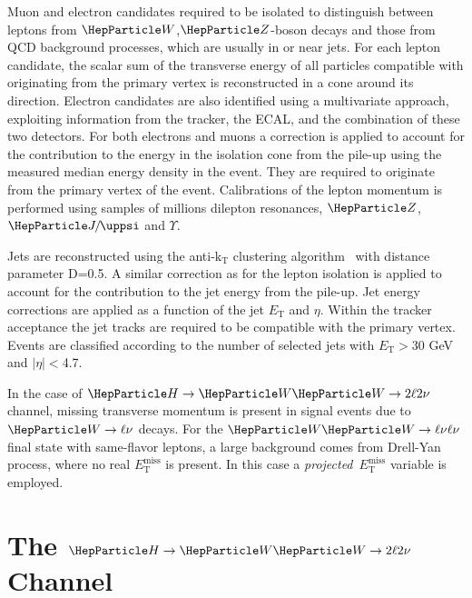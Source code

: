 \documentclass{cimento}
\newcommand{\cPZ}{\PZ} %
\newcommand{\ET}{\ensuremath{E_{\mathrm{T}}}\xspace}
\newcommand{\ETm}{\ensuremath{E_{\mathrm{T}}^{\text{miss}}}\xspace}
\newcommand{\hwwtl}{\ensuremath{\PH\to\PW\PW\to2\ell2\nu}}
\begin{document}
Muon and electron candidates required to be isolated to distinguish
between leptons from $\PW$,$\cPZ$-boson decays and those from QCD
background processes, which are usually in or near jets. For each
lepton candidate, the scalar sum of the transverse energy of all
particles compatible with originating from the primary vertex is
reconstructed in a cone around its direction.  Electron candidates are
also identified using a multivariate approach, exploiting information
from the tracker, the ECAL, and the combination of these two
detectors.  For both electrons and muons a correction is applied to
account for the contribution to the energy in the isolation cone from
the pile-up using the measured median energy density in the
event. They are required to originate from the primary vertex of the
event. Calibrations of the lepton momentum is performed using samples
of millions dilepton resonances, $\cPZ$, $\PJGy$ and $\Upsilon$.

Jets are reconstructed using the anti-$\mathrm{k_T}$ clustering
algorithm~\cite{antikt} with distance parameter D=0.5.  A similar
correction as for the lepton isolation is applied to account for the
contribution to the jet energy from the pile-up. Jet energy
corrections are applied as a function of the jet $\ET$ and $\eta$.
Within the tracker acceptance the jet tracks are required to be
compatible with the primary vertex. Events are classified according to
the number of selected jets with $\ET>30$ GeV and $|\eta|<$4.7.

In the case of $\hwwtl$ channel,
missing transverse momentum is present in signal events due to
$\PW\to\ell\nu$ decays.  For the $\PW\PW\to\ell\nu\ell\nu$ final state
with same-flavor leptons, a large background comes from Drell-Yan
process, where no real $\ETm$ is present. In this case a
\textit{projected}~$\ETm$ variable is employed\cite{HWW2011}.

\section{The $\hwwtl$ Channel}
\label{sec:hww2l2nu}
\end{document}
